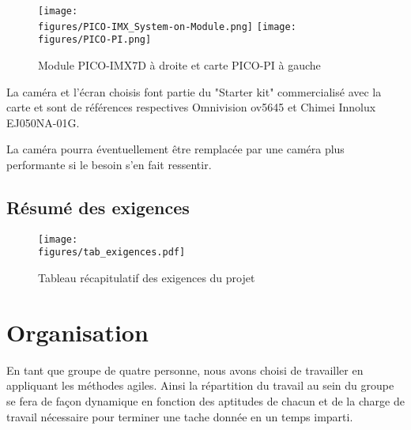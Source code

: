 \begin{figure}[H]
	\centering
    \texttt{[image: \\figures/PICO-IMX\_System-on-Module.png]}
	\hspace{1cm}
    \texttt{[image: \\figures/PICO-PI.png]}
    \decoRule
    \caption[
    Module PICO-IMX7D à droite et carte PICO-PI à gauche]{
    Module PICO-IMX7D à droite et carte PICO-PI à gauche}
    \label{fig:Module PICO-IMX7D à droite et carte PICO-PI à gauche}
	\end{figure}
 
\vspace{1cm}

La caméra et l'écran choisis font partie du "Starter kit" commercialisé avec la carte et sont de références respectives Omnivision ov5645 et Chimei Innolux EJ050NA-01G.

La caméra pourra éventuellement être remplacée par une caméra plus performante si le besoin s'en fait ressentir.

\subsection{Résumé des exigences}

\begin{figure}[H]
	\centering
    \texttt{[image: \\figures/tab\_exigences.pdf]}
    \decoRule
    \caption[
    Tableau récapitulatif des exigences du projet]{
    Tableau récapitulatif des exigences du projet}
    \label{fig:Tableau récapitulatif des exigences du projet}
	\end{figure}



\section{Organisation}


En tant que groupe de quatre personne, nous avons choisi de travailler en appliquant les méthodes agiles. Ainsi la répartition du travail au sein du groupe se fera de façon dynamique en fonction des aptitudes de chacun et de la charge de travail nécessaire pour terminer une tache donnée en un temps imparti.

\vspace{1cm}

